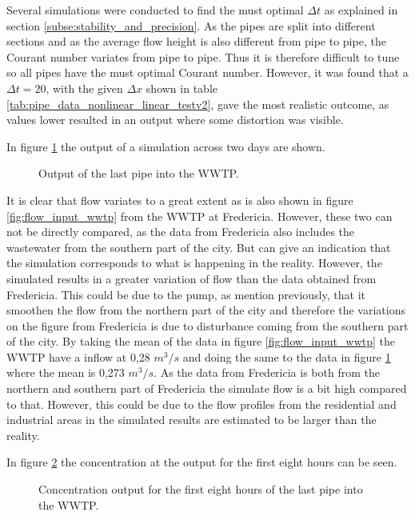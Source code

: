 Several simulations were conducted to find the must optimal $\Delta t$ as explained in section \ref{subse:stability_and_precision}. As the pipes are split into different sections and as the average flow height is also different from pipe to pipe, the Courant number variates from pipe to pipe. Thus it is therefore difficult to tune so all pipes have the must optimal Courant number. However, it was found that a $\Delta t = 20$, with the given $\Delta x$ shown in table \ref{tab:pipe_data_nonlinear_linear_testv2}, gave the most realistic outcome, as values lower resulted in an output where some distortion was visible.

In figure \ref{fig:simulation_output_first} the output of a simulation across two days are shown. 

\begin{figure}[H]
\centering

\caption{Output of the last pipe into the WWTP.}
\label{fig:simulation_output_first}
\end{figure}  

It is clear that flow variates to a great extent as is also shown in figure \ref{fig:flow_input_wwtp} from the WWTP at Fredericia. However, these two can not be directly compared, as the data from Fredericia also includes the wastewater from the southern part of the city. But can give an indication that the simulation corresponds to what is happening in the reality. However, the simulated results in a greater variation of flow than the data obtained from Fredericia. This could be due to the pump, as mention previously, that it smoothen the flow from the northern part of the city and therefore the variations on the figure from Fredericia is due to disturbance coming from the southern part of the city. By taking the mean of the data in figure \ref{fig:flow_input_wwtp} the WWTP have a inflow at 0,28 $m^3/s$ and doing the same to the data in figure \ref{fig:simulation_output_first} where the mean is 0,273 $m^3/s$. As the data from Fredericia is both from the northern and southern part of Fredericia the simulate flow is a bit high compared to that. However, this could be due to the flow profiles from the residential and industrial areas in the simulated results are estimated to be larger than the reality.     

In figure \ref{fig:simulation_output_first_concentration} the concentration at the output for the first eight hours can be seen.

\begin{figure}[H]
\centering

\caption{Concentration output for the first eight hours of the last pipe into the WWTP.}
\label{fig:simulation_output_first_concentration}
\end{figure}  


